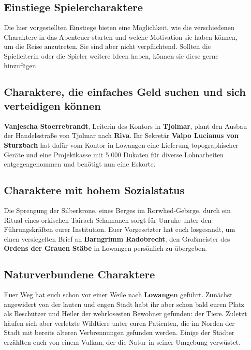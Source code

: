 \neuespalte

\subsection*{Einstiege Spielercharaktere}
Die hier vorgestellten Einstiege bieten eine Möglichkeit, wie die verschiedenen Charaktere in das Abenteuer starten und welche Motivation sie haben können, um die Reise anzutreten.
Sie sind aber nicht verpflichtend.
Sollten die Spielleiterin oder die Spieler weitere Ideen haben, können sie diese gerne hinzufügen.


\subsection*{Charaktere, die einfaches Geld suchen und sich verteidigen können}
\textbf{Vanjescha Stoerrebrandt}, Leiterin des Kontors in \textbf{Tjolmar}, plant den Ausbau der Handelsstraße von Tjolmar nach \textbf{Riva}.
Ihr Sekretär \textbf{Valpo Lucianus von Sturzbach} hat dafür vom Kontor in Lowangen eine Lieferung topographischer Geräte und eine Projektkasse mit 5.000 Dukaten für diverse Lohnarbeiten entgegengenommen und benötigt nun eine Eskorte.

\subsection*{Charaktere mit hohem Sozialstatus}
Die Sprengung der Silberkrone, eines Berges im Rorwhed-Gebirge, durch ein Ritual eines orkischen Tairach-Schamanen sorgt für Unruhe unter den Führungskräften eurer Institution.
Euer Vorgesetzter hat euch losgesandt, um einen versiegelten Brief an \textbf{Barngrimm Radobrecht}, den Großmeister des \textbf{Ordens der Grauen Stäbe} in Lowangen persönlich zu übergeben.

\subsection*{Naturverbundene Charaktere}
Euer Weg hat euch schon vor einer Weile nach \textbf{Lowangen} geführt.
Zunächst angewidert von der lauten und engen Stadt habt ihr aber schon bald euren Platz als Beschützer und Heiler der wehrlosesten Bewohner gefunden: der Tiere.
Zuletzt häufen sich aber verletzte Wildtiere unter euren Patienten, die im Norden der Stadt mit bereits älteren Verbrennungen gefunden werden.
Einige der Städter erzählten euch von einem Vulkan, der die Natur in seiner Umgebung verwüstet.


